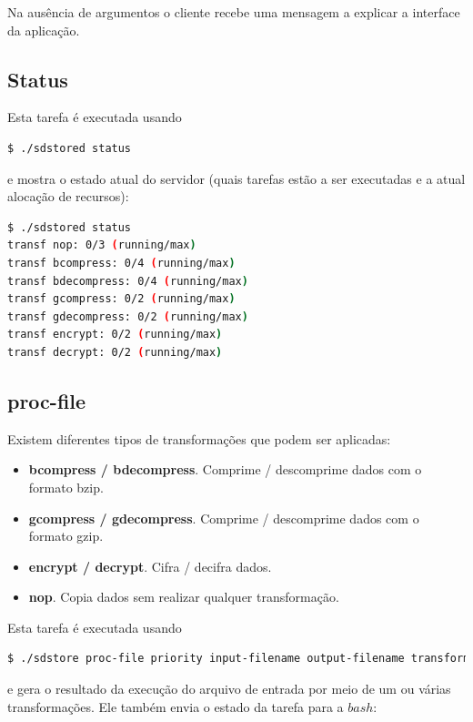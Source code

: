 \documentclass[a4paper]{report}
\begin{document}
    Na ausência de argumentos o cliente recebe uma mensagem a explicar a interface da 
aplicação.
	
	\subsection{Status}
	Esta tarefa é executada usando

    \begin{lstlisting}[language=bash,caption={}]
$ ./sdstored status
\end{lstlisting}

    e mostra o estado atual do servidor (quais tarefas estão a ser executadas e
a atual alocação de recursos):
	\begin{lstlisting}[language=bash,caption={}]
$ ./sdstored status
transf nop: 0/3 (running/max)
transf bcompress: 0/4 (running/max)
transf bdecompress: 0/4 (running/max)
transf gcompress: 0/2 (running/max)
transf gdecompress: 0/2 (running/max)
transf encrypt: 0/2 (running/max)
transf decrypt: 0/2 (running/max)
\end{lstlisting}

    \subsection{proc-file}
    
    Existem diferentes tipos de transformações que podem ser aplicadas:
    \begin{itemize}
        \item \textbf{bcompress / bdecompress}. Comprime / descomprime dados com o formato bzip.
        \item \textbf{gcompress / gdecompress}. Comprime / descomprime dados com o formato gzip.
        \item \textbf{encrypt / decrypt}. Cifra / decifra dados.
        \item \textbf{nop}. Copia dados sem realizar qualquer transformação.
    \end{itemize}
	Esta tarefa é executada usando
	
	\begin{lstlisting}[language=bash,caption={}]
$ ./sdstore proc-file priority input-filename output-filename transformation-id-1 transformation-id-2 ...

\end{lstlisting}

    e gera o resultado da execução do arquivo de entrada por meio de um ou várias transformações. Ele também envia o estado da tarefa para a $bash$:
    
\end{document}

